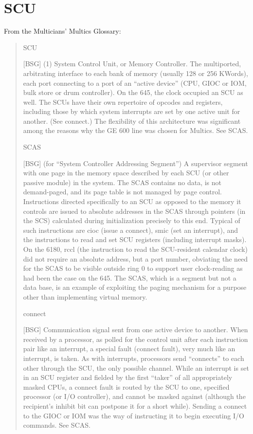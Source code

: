 \documentclass[notitlepage]{report}
\begin{document}
\section{SCU}

From the Multicians' Multics Glossary:

\begin{quote}
SCU

[BSG] (1) System Control Unit, or Memory Controller. The multiported, 
arbitrating interface to each bank of memory (usually 128 or 256 KWords), each
port connecting to a port of an ``active device'' (CPU, GIOC or IOM, bulk store
or drum controller). On the 645, the clock occupied an SCU as well. The SCUs
have their own repertoire of opcodes and registers, including those by which
system interrupts are set by one active unit for another. (See connect.) The
flexibility of this architecture was significant among the reasons why the GE
600 line was chosen for Multics. See SCAS.

SCAS

[BSG] (for ``System Controller Addressing Segment'') A supervisor segment with
one page in the memory space described by each SCU (or other passive module) in
the system. The SCAS contains no data, is not demand-paged, and its page table
is not managed by page control. Instructions directed specifically to an SCU as
opposed to the memory it controls are issued to absolute addresses in the SCAS
through pointers (in the SCS) calculated during initialization precisely to
this end. Typical of such instructions are cioc (issue a connect), smic (set an
interrupt), and the instructions to read and set SCU registers (including
interrupt masks). On the 6180, rccl (the instruction to read the SCU-resident
calendar clock) did not require an absolute address, but a port number,
obviating the need for the SCAS to be visible outside ring 0 to support user
clock-reading as had been the case on the 645. The SCAS, which is a segment but
not a data base, is an example of exploiting the paging mechanism for a purpose
other than implementing virtual memory.

connect

[BSG] Communication signal sent from one active device to another. When
received by a processor, as polled for the control unit after each instruction
pair like an interrupt, a special fault (connect fault), very much like an
interrupt, is taken. As with interrupts, processors send ``connects'' to each
other through the SCU, the only possible channel. While an interrupt is set in
an SCU register and fielded by the first ``taker'' of all appropriately masked
CPUs, a connect fault is routed by the SCU to one, specified processor (or I/O
controller), and cannot be masked against (although the recipient's inhibit bit
can postpone it for a short while). Sending a connect to the GIOC or IOM was
the way of instructing it to begin executing I/O commands. See SCAS.


\end{quote}
\end{document}
